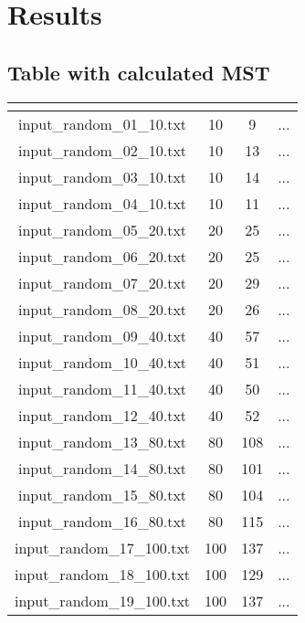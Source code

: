\section{Results}\label{risultati}

\subsection{Table with calculated MST}
	
	\renewcommand{\arraystretch}{1.5}
	\begin{longtable}{|c|c|c|c|}
		\hline
		\rowcolor{title_row}
		\textbf{\color{title_text}{Input file}} &
		\textbf{\color{title_text}{num\_vertex}} & \textbf{\color{title_text}{num\_arches}} & \textbf{\color{title_text}{MST}}\\
		\hline
		\endhead
		input\_random\_01\_10.txt & 10 & 9 & ... \\ \hline 
		input\_random\_02\_10.txt & 10 & 13 & ... \\ \hline 
		input\_random\_03\_10.txt & 10 & 14 & ... \\ \hline
		input\_random\_04\_10.txt & 10 & 11 & ... \\ \hline
		input\_random\_05\_20.txt & 20 & 25 & ... \\ \hline
		input\_random\_06\_20.txt & 20 & 25 & ... \\ \hline
		input\_random\_07\_20.txt & 20 & 29 & ... \\ \hline
		input\_random\_08\_20.txt & 20 & 26 & ... \\ \hline
		input\_random\_09\_40.txt & 40 & 57 & ... \\ \hline
		input\_random\_10\_40.txt & 40 & 51 & ... \\ \hline
		input\_random\_11\_40.txt & 40 & 50 & ... \\ \hline
		input\_random\_12\_40.txt & 40 & 52 & ... \\ \hline
		input\_random\_13\_80.txt & 80 & 108 & ... \\ \hline
		input\_random\_14\_80.txt & 80 & 101 & ... \\ \hline
		input\_random\_15\_80.txt & 80 & 104 & ... \\ \hline
		input\_random\_16\_80.txt & 80 & 115 & ... \\ \hline
		input\_random\_17\_100.txt & 100 & 137 & ... \\ \hline
		input\_random\_18\_100.txt & 100 & 129 & ... \\ \hline
		input\_random\_19\_100.txt & 100 & 137 & ... \\ \hline

\end{longtable}
